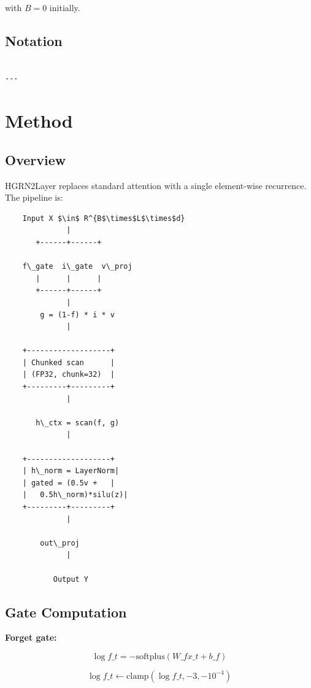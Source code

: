 with $B = 0$ initially.

\subsection{Notation}

\begin{lstlisting}

---
\end{lstlisting}

\section{Method}

\subsection{Overview}

HGRN2Layer replaces standard attention with a single element-wise recurrence. 
The pipeline is:

\begin{lstlisting}
    Input X $\in$ R^{B$\times$L$\times$d}
              |
       +------+------+
                      
    f\_gate  i\_gate  v\_proj
       |      |      |
       +------+------+
              |
        g = (1-f) * i * v
              |
               
    +-------------------+
    | Chunked scan      |
    | (FP32, chunk=32)  |
    +---------+---------+
              |
               
       h\_ctx = scan(f, g)
              |
               
    +-------------------+
    | h\_norm = LayerNorm|
    | gated = (0.5v +   |
    |   0.5h\_norm)*silu(z)|
    +---------+---------+
              |
               
        out\_proj
              |
               
           Output Y
\end{lstlisting}

\subsection{Gate Computation}

\textbf{Forget gate:}

\[
\log f\_t = -\text{softplus}(W\_f x\_t + b\_f)
\tag{4.1}
\]

\[
\log f\_t \leftarrow \text{clamp}(\log f\_t, -3, -10^{-4})
\tag{4.2}
\]

